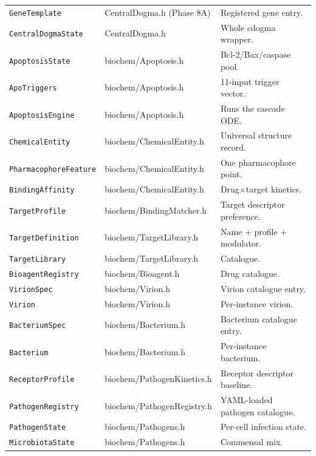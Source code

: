 \documentclass[11pt,letterpaper,twoside,openany]{book}
\newcommand{\code}[1]{\texttt{#1}}
\begin{document}
\begin{longtable}{p{4.4cm}p{3.0cm}p{7.0cm}}
\code{GeneTemplate}       & CentralDogma.h (Phase 8A)           & Registered gene entry.\\
\code{CentralDogmaState}  & CentralDogma.h                      & Whole cdogma wrapper.\\
\code{ApoptosisState}     & biochem/Apoptosis.h                 & Bcl-2/Bax/caspase pool.\\
\code{ApoTriggers}        & biochem/Apoptosis.h                 & 11-input trigger vector.\\
\code{ApoptosisEngine}    & biochem/Apoptosis.h                 & Runs the cascade ODE.\\
\code{ChemicalEntity}     & biochem/ChemicalEntity.h            & Universal structure record.\\
\code{PharmacophoreFeature}&biochem/ChemicalEntity.h            & One pharmacophore point.\\
\code{BindingAffinity}    & biochem/ChemicalEntity.h            & Drug$\times$target kinetics.\\
\code{TargetProfile}      & biochem/BindingMatcher.h            & Target descriptor preference.\\
\code{TargetDefinition}   & biochem/TargetLibrary.h             & Name + profile + modulator.\\
\code{TargetLibrary}      & biochem/TargetLibrary.h             & Catalogue.\\
\code{BioagentRegistry}   & biochem/Bioagent.h                  & Drug catalogue.\\
\code{VirionSpec}         & biochem/Virion.h                    & Virion catalogue entry.\\
\code{Virion}             & biochem/Virion.h                    & Per-instance virion.\\
\code{BacteriumSpec}      & biochem/Bacterium.h                 & Bacterium catalogue entry.\\
\code{Bacterium}          & biochem/Bacterium.h                 & Per-instance bacterium.\\
\code{ReceptorProfile}    & biochem/PathogenKinetics.h          & Receptor descriptor baseline.\\
\code{PathogenRegistry}   & biochem/PathogenRegistry.h          & YAML-loaded pathogen catalogue.\\
\code{PathogenState}      & biochem/Pathogens.h                 & Per-cell infection state.\\
\code{MicrobiotaState}    & biochem/Pathogens.h                 & Commensal mix.\\

\end{longtable}
\end{document}
